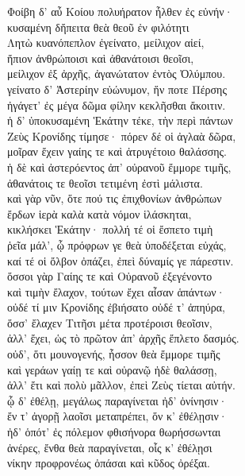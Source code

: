 \begin{pages}
\begin{Leftside}
\quad{}Φοίβη δ' αὖ Κοίου πολυήρατον ἦλθεν ἐς εὐνήν· \\
κυσαμένη δἤπειτα θεὰ θεοῦ ἐν φιλότητι  \\
Λητὼ κυανόπεπλον ἐγείνατο, μείλιχον αἰεί,\\
ἤπιον ἀνθρώποισι καὶ ἀθανάτοισι θεοῖσι, \\
μείλιχον ἐξ ἀρχῆς, ἀγανώτατον ἐντὸς Ὀλύμπου.\\
γείνατο δ' Ἀστερίην εὐώνυμον, ἥν ποτε Πέρσης\\
ἠγάγετ' ἐς μέγα δῶμα φίλην κεκλῆσθαι ἄκοιτιν. \\

\quad{}ἡ δ' ὑποκυσαμένη Ἑκάτην τέκε, τὴν περὶ πάντων \\
Ζεὺς Κρονίδης τίμησε· πόρεν δέ οἱ ἀγλαὰ δῶρα, \\
μοῖραν ἔχειν γαίης τε καὶ ἀτρυγέτοιο θαλάσσης.\\
ἡ δὲ καὶ ἀστερόεντος ἀπ' οὐρανοῦ ἔμμορε τιμῆς, \\
ἀθανάτοις τε θεοῖσι τετιμένη ἐστὶ μάλιστα. \\
καὶ γὰρ νῦν, ὅτε πού τις ἐπιχθονίων ἀνθρώπων\\
ἔρδων ἱερὰ καλὰ κατὰ νόμον ἱλάσκηται,\\
κικλήσκει Ἑκάτην· πολλή τέ οἱ ἔσπετο τιμὴ \\
ῥεῖα μάλ', ᾧ πρόφρων γε θεὰ ὑποδέξεται εὐχάς,\\
καί τέ οἱ ὄλβον ὀπάζει, ἐπεὶ δύναμίς γε πάρεστιν. \\
ὅσσοι γὰρ Γαίης τε καὶ Οὐρανοῦ ἐξεγένοντο\\
καὶ τιμὴν ἔλαχον, τούτων ἔχει αἶσαν ἁπάντων· \\
οὐδέ τί μιν Κρονίδης ἐβιήσατο οὐδέ τ' ἀπηύρα,\\
ὅσσ' ἔλαχεν Τιτῆσι μέτα προτέροισι θεοῖσιν, \\
ἀλλ' ἔχει, ὡς τὸ πρῶτον ἀπ' ἀρχῆς ἔπλετο δασμός.  \\
οὐδ', ὅτι μουνογενής, ἧσσον θεὰ ἔμμορε τιμῆς \\
καὶ γεράων γαίῃ τε καὶ οὐρανῷ ἠδὲ θαλάσσῃ, \\
ἀλλ' ἔτι καὶ πολὺ μᾶλλον, ἐπεὶ Ζεὺς τίεται αὐτήν.\\
ᾧ δ' ἐθέλῃ, μεγάλως παραγίνεται ἠδ' ὀνίνησιν· \\
ἔν τ' ἀγορῇ λαοῖσι μεταπρέπει, ὅν κ' ἐθέλῃσιν·  \\
ἠδ' ὁπότ' ἐς πόλεμον φθισήνορα θωρήσσωνται\\
ἀνέρες, ἔνθα θεὰ παραγίνεται, οἷς κ' ἐθέλῃσι\\
νίκην προφρονέως ὀπάσαι καὶ κῦδος ὀρέξαι.\\

\end{Leftside}
\end{pages}
